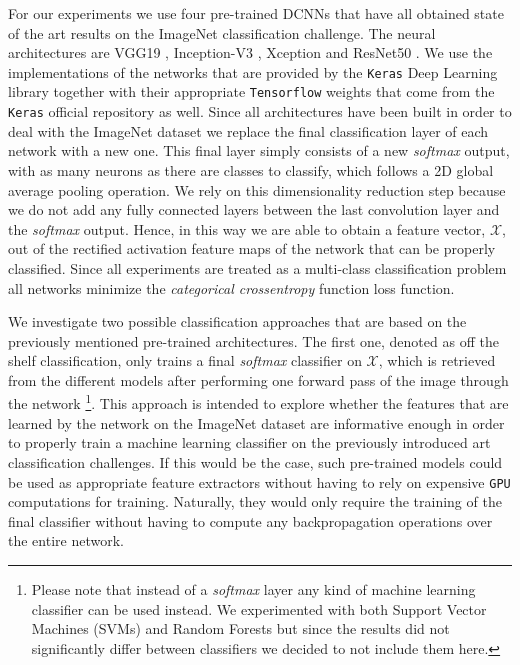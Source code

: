 For our experiments we use four pre-trained DCNNs that have all obtained state of the art results on the ImageNet classification challenge. The neural architectures are VGG19 \cite{simonyan2014very}, Inception-V3 \cite{szegedy2016rethinking}, Xception \cite{chollet2016xception} and ResNet50 \cite{xie2017aggregated}. We use the implementations of the networks that are provided by the \texttt{Keras} Deep Learning library \cite{chollet2015keras} together with their appropriate \texttt{Tensorflow} weights \cite{abadi2016tensorflow} that come from the \texttt{Keras} official repository as well. Since all architectures have been built in order to deal with the ImageNet dataset we replace the final classification layer of each network with a new one. This final layer simply consists of a new \textit{softmax} output, with as many neurons as there are classes to classify, which follows a 2D global average pooling operation. We rely on this dimensionality reduction step because we do not add any fully connected layers between the last convolution layer and the \textit{softmax} output. Hence, in this way we are able to obtain a feature vector, $\mathscr{X}$, out of the rectified activation feature maps of the network that can be properly classified. Since all experiments are treated as a multi-class classification problem all networks minimize the \textit{categorical crossentropy} function loss function.

We investigate two possible classification approaches that are based on the previously mentioned pre-trained architectures. The first one, denoted as off the shelf classification, only trains a final \textit{softmax} classifier on $\mathscr{X}$, which is retrieved from the different models after performing one forward pass of the image through the network \footnote{Please note that instead of a \textit{softmax} layer any kind of machine learning classifier can be used instead. We experimented with both Support Vector Machines (SVMs) and Random Forests but since the results did not significantly differ between classifiers we decided to not include them here.}. This approach is intended to explore whether the features that are learned by the network on the ImageNet dataset are informative enough in order to properly train a machine learning classifier on the previously introduced art classification challenges. If this would be the case, such pre-trained models could be used as appropriate feature extractors without having to rely on expensive \texttt{GPU} computations for training. Naturally, they would only require the training of the final classifier without having to compute any backpropagation operations over the entire network. 

